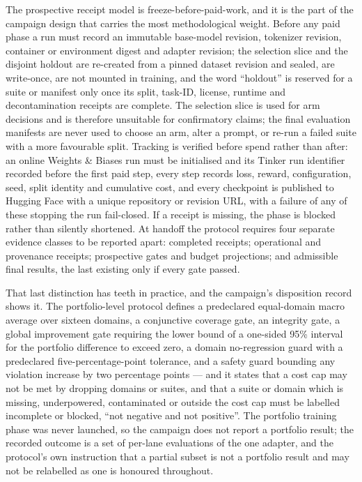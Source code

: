 \documentclass[12pt,a4paper]{report}
\begin{document}
The prospective receipt model is freeze-before-paid-work, and it is the
part of the campaign design that carries the most methodological weight.
Before any paid phase a run must record an immutable base-model
revision, tokenizer revision, container or environment digest and
adapter revision; the selection slice and the disjoint holdout are
re-created from a pinned dataset revision and sealed, are write-once,
are not mounted in training, and the word ``holdout'' is reserved for a
suite or manifest only once its split, task-ID, license, runtime and
decontamination receipts are complete. The selection slice is used for
arm decisions and is therefore unsuitable for confirmatory claims; the
final evaluation manifests are never used to choose an arm, alter a
prompt, or re-run a failed suite with a more favourable split. Tracking
is verified before spend rather than after: an online Weights \& Biases
run must be initialised and its Tinker run identifier recorded before
the first paid step, every step records loss, reward, configuration,
seed, split identity and cumulative cost, and every checkpoint is
published to Hugging Face with a unique repository or revision URL, with
a failure of any of these stopping the run fail-closed. If a receipt is
missing, the phase is blocked rather than silently shortened. At handoff
the protocol requires four separate evidence classes to be reported
apart: completed receipts; operational and provenance receipts;
prospective gates and budget projections; and admissible final results,
the last existing only if every gate passed.

That last distinction has teeth in practice, and the campaign's
disposition record shows it. The portfolio-level protocol defines a
predeclared equal-domain macro average over sixteen domains, a
conjunctive coverage gate, an integrity gate, a global improvement gate
requiring the lower bound of a one-sided 95\% interval for the portfolio
difference to exceed zero, a domain no-regression guard with a
predeclared five-percentage-point tolerance, and a safety guard bounding
any violation increase by two percentage points --- and it states that a
cost cap may not be met by dropping domains or suites, and that a suite
or domain which is missing, underpowered, contaminated or outside the
cost cap must be labelled incomplete or blocked, ``not negative and not
positive''. The portfolio training phase was never launched, so the
campaign does not report a portfolio result; the recorded outcome is a
set of per-lane evaluations of the one adapter, and the protocol's own
instruction that a partial subset is not a portfolio result and may not
be relabelled as one is honoured throughout.
\end{document}
